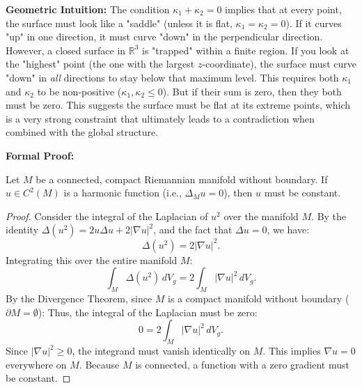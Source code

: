 \begin{solution}
\textbf{Geometric Intuition:}
The condition $\kappa_1 + \kappa_2 = 0$ implies that at every point, the surface must look like a "saddle" (unless it is flat, $\kappa_1 = \kappa_2 = 0$). If it curves "up" in one direction, it must curve "down" in the perpendicular direction.
However, a closed surface in $\mathbb{R}^3$ is "trapped" within a finite region. If you look at the "highest" point (the one with the largest $z$-coordinate), the surface must curve "down" in \textit{all} directions to stay below that maximum level. This requires both $\kappa_1$ and $\kappa_2$ to be non-positive ($\kappa_1, \kappa_2 \le 0$). But if their sum is zero, then they both must be zero. This suggests the surface must be flat at its extreme points, which is a very strong constraint that ultimately leads to a contradiction when combined with the global structure.

\textbf{Formal Proof:}

\begin{lemma}
Let $M$ be a connected, compact Riemannian manifold without boundary. If $u \in C^2(M)$ is a harmonic function (i.e., $\Delta_M u = 0$), then $u$ must be constant.
\end{lemma}

\begin{proof}
Consider the integral of the Laplacian of $u^2$ over the manifold $M$. By the identity $\Delta(u^2) = 2u\Delta u + 2|\nabla u|^2$, and the fact that $\Delta u = 0$, we have:
\[
\Delta(u^2) = 2|\nabla u|^2.
\]
Integrating this over the entire manifold $M$:
\[
\int_M \Delta(u^2) \, dV_g = 2 \int_M |\nabla u|^2 \, dV_g.
\]
By the Divergence Theorem, since $M$ is a compact manifold without boundary ($\partial M = \emptyset$):
Thus, the integral of the Laplacian must be zero:
\[
0 = 2 \int_M |\nabla u|^2 \, dV_g.
\]
Since $|\nabla u|^2 \ge 0$, the integrand must vanish identically on $M$. This implies $\nabla u = 0$ everywhere on $M$. Because $M$ is connected, a function with a zero gradient must be constant.
\end{proof}


\end{solution}
